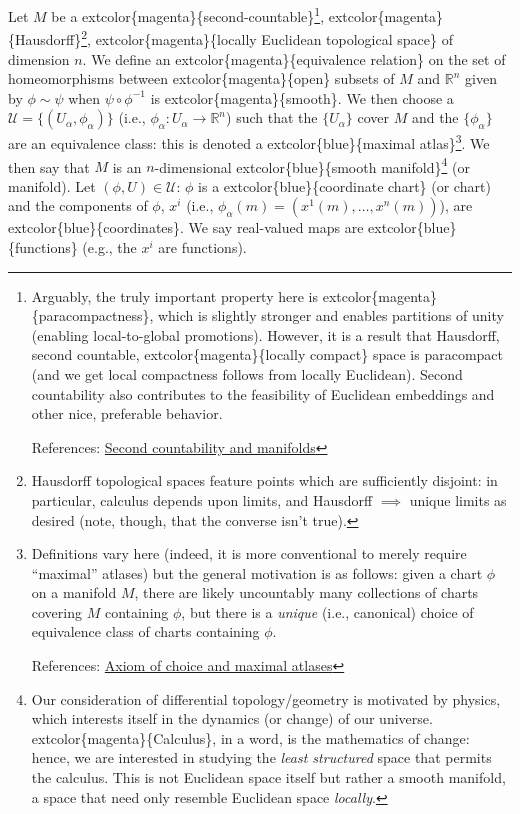 \documentclass[
]{book}
\begin{document}
Let \(M\) be a extcolor\{magenta\}\{second-countable\}\footnote{Arguably, the truly important property here is extcolor\{magenta\}\{paracompactness\}, which is slightly stronger and enables partitions of unity (enabling local-to-global promotions). However, it is a result that Hausdorff, second countable, extcolor\{magenta\}\{locally compact\} space is paracompact (and we get local compactness follows from locally Euclidean). Second countability also contributes to the feasibility of Euclidean embeddings and other nice, preferable behavior.

  References: \href{https://math.stackexchange.com/questions/2131530/why-is-important-for-a-manifold-to-have-countable-basis}{Second countability and manifolds}}, extcolor\{magenta\}\{Hausdorff\}\footnote{Hausdorff topological spaces feature points which are sufficiently disjoint: in particular, calculus depends upon limits, and Hausdorff \(\implies\) unique limits as desired (note, though, that the converse isn't true).}, extcolor\{magenta\}\{locally Euclidean topological space\} of dimension \(n\). We define an extcolor\{magenta\}\{equivalence relation\} on the set of homeomorphisms between extcolor\{magenta\}\{open\} subsets of \(M\) and \(\mathbb{R}^n\) given by \(\phi \sim \psi\) when \(\psi \circ \phi^{-1}\) is extcolor\{magenta\}\{smooth\}. We then choose a \(\mathcal{U} = \{(U_\alpha, \phi_\alpha)\}\) (i.e., \(\phi_\alpha : U_\alpha \to \mathbb{R}^n\)) such that the \(\{U_\alpha\}\) cover \(M\) and the \(\{\phi_\alpha\}\) are an equivalence class: this is denoted a extcolor\{blue\}\{maximal atlas\}\footnote{Definitions vary here (indeed, it is more conventional to merely require ``maximal'' atlases) but the general motivation is as follows: given a chart \(\phi\) on a manifold \(M\), there are likely uncountably many collections of charts covering \(M\) containing \(\phi\), but there is a \emph{unique} (i.e., canonical) choice of equivalence class of charts containing \(\phi\).

  References: \href{https://math.stackexchange.com/questions/66554/is-zorns-lemma-required-to-prove-the-existence-of-a-maximal-atlas-on-a-manifold}{Axiom of choice and maximal atlases}}. We then say that \(M\) is an \(n\)-dimensional extcolor\{blue\}\{smooth manifold\}\footnote{Our consideration of differential topology/geometry is motivated by physics, which interests itself in the dynamics (or change) of our universe. extcolor\{magenta\}\{Calculus\}, in a word, is the mathematics of change: hence, we are interested in studying the \emph{least structured} space that permits the calculus. This is not Euclidean space itself but rather a smooth manifold, a space that need only resemble Euclidean space \emph{locally}.} (or manifold). Let \((\phi, U) \in \mathcal{U}\): \(\phi\) is a extcolor\{blue\}\{coordinate chart\} (or chart) and the components of \(\phi\), \(x^i\) (i.e., \(\phi_\alpha(m) = (x^1(m), \dots, x^n(m))\)), are extcolor\{blue\}\{coordinates\}. We say real-valued maps are extcolor\{blue\}\{functions\} (e.g., the \(x^i\) are functions).
\end{document}
